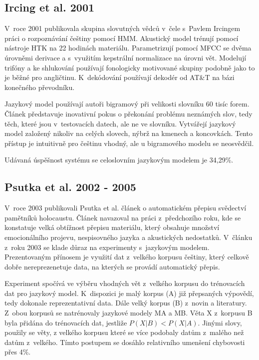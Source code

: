 \subsection{Ircing et al. 2001}

V~roce 2001 publikovala skupina slovutných vědců v~čele s~Pavlem Ircingem práci
o rozpoznávání češtiny pomocí HMM\cite{ircing2001large}. Akustický model trénují
pomocí nástroje HTK na 22 hodinách materiálu. Parametrizují pomocí MFCC se dvěma
úrovněmi derivace a s~využitím kepstrální normalizace na úrovni vět. Modelují
trifóny a ke shlukování používají fonologicky motivované skupiny podobně jako to
je běžné pro angličtinu. K~dekódování používají dekodér od AT\&T na bázi
konečného převodníku\cite{mohri2002weighted}.

Jazykový model používají autoři bigramový při velikosti slovníku 60 tisíc forem.
Článek představuje inovativní pokus o překonání problému neznámých slov, tedy
těch, které jsou v~testovacích datech, ale ne ve slovníku. Vytvářejí jazykový
model založený nikoliv na celých slovech, nýbrž na kmenech a koncovkách. Tento
přístup je intuitivně pro češtinu vhodný, ale u bigramového modelu se
neosvědčil.

Udávaná úspěšnost systému se celoslovním jazykovým modelem je 34,29\%.

\subsection{Psutka et al. 2002 - 2005}

V~roce 2003 publikovali Psutka et al. článek o automatickém přepisu svědectví
pamětníků holocaustu\cite{psutka2003large}. Článek navazoval na práci
z~předchozího roku\cite{psutka2002automatic}, kde se konstatuje velká obtížnost
přepisu materiálu, který obsahuje množství emocionálního projevu, nespisovného
jazyka a akustických nedostatků. V~článku z~roku 2003 se klade důraz na
experimenty s~jazykovým modelem. Prezentovaným přínosem je využití dat z~velkého
korpusu češtiny, který celkově dobře nereprezenetuje data, na kterých se provádí
automatický přepis.

Experiment spočívá ve výběru vhodných vět z~velkého korpusu do trénovacích dat
pro jazykový model. K~dispozici je malý korpus (A) již přepsaných výpovědí, tedy
dokonale reprezentativní data. Dále velký korpus (B) z~novin a literatury.
Z~obou korpusů se natrénovaly jazykové modely MA a MB. Věta X z~korpusu B byla
přidána do trénovacích dat, jestliže $P(X|B) < P(X|A)$. Jinými slovy, použily se
věty, z velkého korpusu které se více podobaly datům z~malého než datům
z~velkého. Tímto postupem se dosáhlo relativního umenšení chybovosti přes 4\%.

